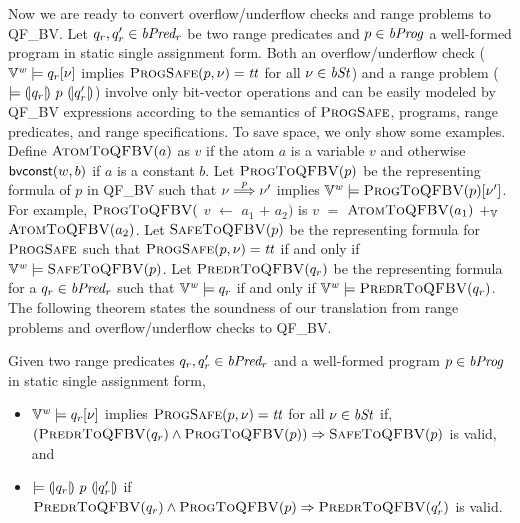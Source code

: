 Now we are ready to convert overflow/underflow checks and range problems to QF\_BV.
Let $q_r, q_r' \in \mathit{bPred_r}$ be two range predicates and $p \in \mathit{bProg}$ a well-formed program in static single assignment form.
Both an overflow/underflow check ($\mathbb{V}^{\mathit{w}} \models q_r[\nu]$ implies $\textsc{ProgSafe}(p, \nu) = \mathit{tt}$ for all $\nu \in \mathit{bSt}$) and a range problem ($\models {(\!|}{q_r}{|\!)}~{p}~{(\!|}{q_r'}{|\!)}$) involve only bit-vector operations and can be easily modeled by QF\_BV expressions according to the semantics of $\textsc{ProgSafe}$, programs, range predicates, and range specifications.
To save space, we only show some examples.
Define $\textsc{AtomToQFBV}(a)$ as $v$ if the atom $a$ is a variable $v$ and otherwise $\mbox{\textsf{bvconst}}(w, b)$ if $a$ is a constant $b$.
Let $\textsc{ProgToQFBV}(p)$ be the representing formula of $p$ in QF\_BV such that $\nu \overset{p}{\Longrightarrow} \nu'$ implies $\mathbb{V}^{\mathit{w}} \models \textsc{ProgToQFBV}(p)[\nu']$.
For example, $\textsc{ProgToQFBV}($ $v$ $\leftarrow$ $a_1$ $+$ $a_2)$ is $v$ $=$ $\textsc{AtomToQFBV}(a_1)$ $+_{\mathbb{V}}$ $\textsc{AtomToQFBV}(a_2)$.
Let $\textsc{SafeToQFBV}(p)$ be the representing formula for $\textsc{ProgSafe}$ such that $\textsc{ProgSafe}(p, \nu) = \mathit{tt}$ if and only if $\mathbb{V}^{\mathit{w}} \models \textsc{SafeToQFBV}(p)$.
Let $\textsc{PredrToQFBV}(q_r)$ be the representing formula for a $q_r \in \mathit{bPred_r}$ such that $\mathbb{V}^{\mathit{w}} \models q_r$ if and only if $\mathbb{V}^{\mathit{w}} \models \textsc{PredrToQFBV}(q_r)$.
The following theorem states the soundness of our translation from range problems and overflow/underflow checks to QF\_BV.

\begin{theorem}
Given two range predicates $q_r, q_r' \in \mathit{bPred_r}$ and a well-formed program $p \in \mathit{bProg}$ in static single assignment form,
\begin{itemize}
\item $\mathbb{V}^{\mathit{w}} \models q_r[\nu]$ implies $\textsc{ProgSafe}(p, \nu) = \mathit{tt}$ for all $\nu \in \mathit{bSt}$ if, $(\textsc{PredrToQFBV}(q_r) \wedge \textsc{ProgToQFBV}(p)) \Rightarrow \textsc{SafeToQFBV}(p)$ is valid, and
\item $\models {(\!|}{q_r}{|\!)}~{p}~{(\!|}{q_r'}{|\!)}$ if $\textsc{PredrToQFBV}(q_r) \wedge \textsc{ProgToQFBV}(p) \Rightarrow \textsc{PredrToQFBV}(q_r')$ is valid.
\end{itemize}
\label{theorem:to-qfbv}
\end{theorem}





